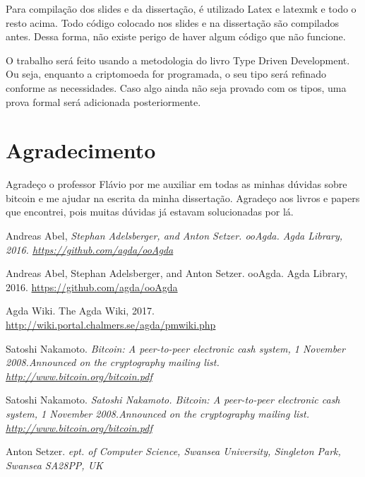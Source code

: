 \documentclass[12pt]{report}
\begin{document}
Para compilação dos slides e da dissertação, é utilizado Latex e latexmk e todo o resto acima.
Todo código colocado nos slides e na dissertação são compilados antes. Dessa forma, não existe perigo de haver algum código que não funcione.

O trabalho será feito usando a metodologia do livro Type Driven Development. Ou seja, enquanto a criptomoeda for programada, o seu tipo será refinado conforme as necessidades. Caso algo ainda não seja provado com os tipos, uma prova formal será adicionada posteriormente.

\newpage
\section{Agradecimento}

Agradeço o professor Flávio por me auxiliar em todas as minhas dúvidas sobre bitcoin e me ajudar na escrita da minha dissertação. 
Agradeço aos livros e papers que encontrei, pois muitas dúvidas já estavam solucionadas por lá.

\newpage
 
\begin{thebibliography}{111}

    Andreas Abel, 
    {\it Stephan Adelsberger, and Anton Setzer. ooAgda. Agda Library, 2016. 
    \url{https://github.com/agda/ooAgda}}
    
    Andreas Abel, Stephan Adelsberger, and Anton Setzer. ooAgda. Agda Library, 2016. 
    \url{https://github.com/agda/ooAgda}

    Agda Wiki.  The Agda Wiki, 2017.  
    \url{http://wiki.portal.chalmers.se/agda/pmwiki.php}
    
    Satoshi Nakamoto.  
    {\it Bitcoin:  A peer-to-peer electronic cash system, 1 November 2008.Announced on the cryptography mailing list. \url{http://www.bitcoin.org/bitcoin.pdf}}

    Satoshi Nakamoto.  
    {\it Satoshi Nakamoto.  Bitcoin:  A peer-to-peer electronic cash system, 1 November 2008.Announced on the cryptography mailing list. \url{http://www.bitcoin.org/bitcoin.pdf}}

Anton Setzer.  
{\it ept. of Computer Science, Swansea University, Singleton Park, Swansea SA28PP, UK}

\end{thebibliography}
\end{document}
